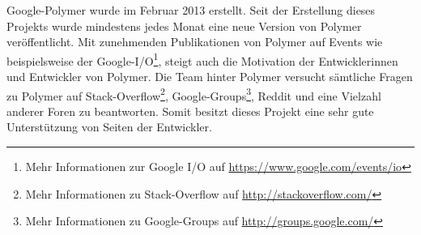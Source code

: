 Google-Polymer wurde im Februar 2013 erstellt. Seit der Erstellung dieses Projekts wurde mindestens jedes Monat eine neue Version von Polymer veröffentlicht. Mit zunehmenden Publikationen von Polymer auf Events wie beispielsweise der Google-I/O\footnote{Mehr Informationen zur Google I/O auf \href{https://www.google.com/events/io}{https://www.google.com/events/io}}, steigt auch die Motivation der Entwicklerinnen und Entwickler von Polymer. Die Team hinter Polymer versucht sämtliche Fragen zu Polymer auf Stack-Overflow\footnote{Mehr Informationen zu Stack-Overflow auf \href{http://stackoverflow.com/}{http://stackoverflow.com/}}, Google-Groups\footnote{Mehr Informationen zu Google-Groups auf \href{http://groups.google.com/}{http://groups.google.com/}}, Reddit und eine Vielzahl anderer Foren zu beantworten. Somit besitzt dieses Projekt eine sehr gute Unterstützung von Seiten der Entwickler.


